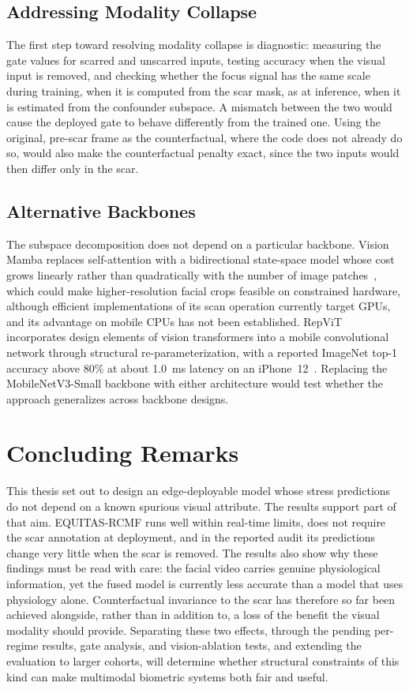 \subsection{Addressing Modality Collapse}
The first step toward resolving modality collapse is diagnostic: measuring the gate values for scarred and unscarred inputs, testing accuracy when the visual input is removed, and checking whether the focus signal has the same scale during training, when it is computed from the scar mask, as at inference, when it is estimated from the confounder subspace. A mismatch between the two would cause the deployed gate to behave differently from the trained one. Using the original, pre-scar frame as the counterfactual, where the code does not already do so, would also make the counterfactual penalty exact, since the two inputs would then differ only in the scar.

\subsection{Alternative Backbones}
The subspace decomposition does not depend on a particular backbone. Vision Mamba replaces self-attention with a bidirectional state-space model whose cost grows linearly rather than quadratically with the number of image patches~\cite{zhu2024vim}, which could make higher-resolution facial crops feasible on constrained hardware, although efficient implementations of its scan operation currently target GPUs, and its advantage on mobile CPUs has not been established. RepViT incorporates design elements of vision transformers into a mobile convolutional network through structural re-parameterization, with a reported ImageNet top-1 accuracy above 80\% at about 1.0~ms latency on an iPhone~12~\cite{wang2024repvit}. Replacing the MobileNetV3-Small backbone with either architecture would test whether the approach generalizes across backbone designs.

\section{Concluding Remarks}
This thesis set out to design an edge-deployable model whose stress predictions do not depend on a known spurious visual attribute. The results support part of that aim. EQUITAS-RCMF runs well within real-time limits, does not require the scar annotation at deployment, and in the reported audit its predictions change very little when the scar is removed. The results also show why these findings must be read with care: the facial video carries genuine physiological information, yet the fused model is currently less accurate than a model that uses physiology alone. Counterfactual invariance to the scar has therefore so far been achieved alongside, rather than in addition to, a loss of the benefit the visual modality should provide. Separating these two effects, through the pending per-regime results, gate analysis, and vision-ablation tests, and extending the evaluation to larger cohorts, will determine whether structural constraints of this kind can make multimodal biometric systems both fair and useful.
